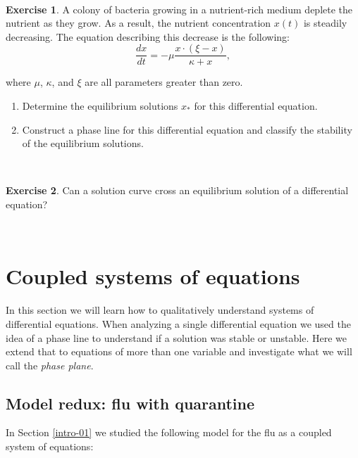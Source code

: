 \documentclass[
]{book}
\theoremstyle{definition}
\theoremstyle{definition}
\theoremstyle{definition}
\newtheorem{exercise}{Exercise}[chapter]
\theoremstyle{remark}
\begin{document}
~

\begin{exercise}
\protect\hypertarget{exr:unnamed-chunk-94}{}{\label{exr:unnamed-chunk-94} }A colony of bacteria growing in a nutrient-rich medium deplete the nutrient as they grow. As a result, the nutrient concentration \(x(t)\) is steadily decreasing. The equation describing this decrease is the following:
\[ \displaystyle \frac{dx}{dt} = - \mu \frac{x \cdot (\xi- x)}{\kappa + x}, \]

where \(\mu\), \(\kappa\), and \(\xi\) are all parameters greater than zero.

\begin{enumerate}[label=\alph*.]
\item Determine the equilibrium solutions $x_{*}$ for this differential equation.
\item Construct a phase line for this differential equation and classify the stability of the equilibrium solutions.
\end{enumerate}
\end{exercise}

~

\begin{exercise}
\protect\hypertarget{exr:unnamed-chunk-95}{}{\label{exr:unnamed-chunk-95} }Can a solution curve cross an equilibrium solution of a differential equation?
\end{exercise}
~

\hypertarget{coupled-06}{%
\chapter{Coupled systems of equations}\label{coupled-06}}

In this section we will learn how to qualitatively understand systems of differential equations. When analyzing a single differential equation we used the idea of a phase line to understand if a solution was stable or unstable. Here we extend that to equations of more than one variable and investigate what we will call the \emph{phase plane}.

\hypertarget{model-redux-flu-with-quarantine}{%
\section{Model redux: flu with quarantine}\label{model-redux-flu-with-quarantine}}

In Section \ref{intro-01} we studied the following model for the flu as a coupled system of equations:
\end{document}
